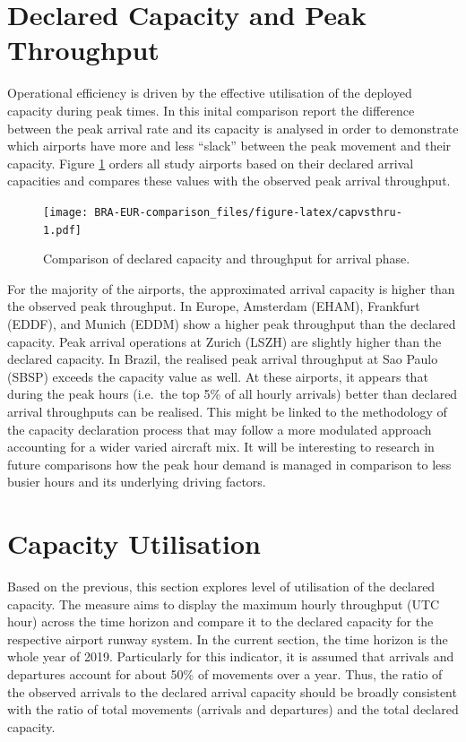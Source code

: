 \documentclass[
]{book}
\begin{document}
\hypertarget{declared-capacity-and-peak-throughput}{%
\section{Declared Capacity and Peak Throughput}\label{declared-capacity-and-peak-throughput}}

Operational efficiency is driven by the effective utilisation of the deployed capacity during peak times.
In this inital comparison report the difference between the peak arrival rate and its capacity is analysed in order to demonstrate which airports have more and less ``slack'' between the peak movement and their capacity.
Figure \ref{fig:capvsthru} orders all study airports based on their declared arrival capacities and compares these values with the observed peak arrival throughput.



\begin{figure}
\centering
\texttt{[image: BRA-EUR-comparison\_files/figure-latex/capvsthru-1.pdf]}
\caption{\label{fig:capvsthru}Comparison of declared capacity and throughput for arrival phase.}
\end{figure}

For the majority of the airports, the approximated arrival capacity is higher than the observed peak throughput.
In Europe, Amsterdam (EHAM), Frankfurt (EDDF), and Munich (EDDM) show a higher peak throughput than the declared capacity. Peak arrival operations at Zurich (LSZH) are slightly higher than the declared capacity.
In Brazil, the realised peak arrival throughput at Sao Paulo (SBSP) exceeds the capacity value as well.
At these airports, it appears that during the peak hours (i.e.~the top 5\% of all hourly arrivals) better than declared arrival throughputs can be realised.
This might be linked to the methodology of the capacity declaration process that may follow a more modulated approach accounting for a wider varied aircraft mix.
It will be interesting to research in future comparisons how the peak hour demand is managed in comparison to less busier hours and its underlying driving factors.

\hypertarget{capacity-utilisation}{%
\section{Capacity Utilisation}\label{capacity-utilisation}}

Based on the previous, this section explores level of utilisation of the declared capacity.
The measure aims to display the maximum hourly throughput (UTC hour) across the time horizon and compare it to the declared capacity for the respective airport runway system.
In the current section, the time horizon is the whole year of 2019.
Particularly for this indicator, it is assumed that arrivals and departures account for about 50\% of movements over a year.
Thus, the ratio of the observed arrivals to the declared arrival capacity should be broadly consistent with the ratio of total movements (arrivals and departures) and the total declared capacity.
\end{document}
